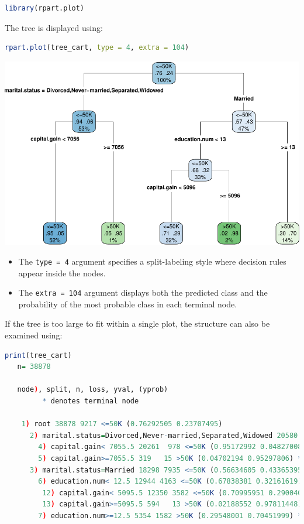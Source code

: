 \documentclass[
]{book}
\newcommand{\passthrough}[1]{#1}
\providecommand{\tightlist}{%
  \setlength{\itemsep}{0pt}\setlength{\parskip}{0pt}}
\theoremstyle{definition}
\theoremstyle{definition}
\theoremstyle{definition}
\theoremstyle{definition}
\theoremstyle{remark}
\begin{document}
\begin{lstlisting}[language=R]
library(rpart.plot)
\end{lstlisting}

The tree is displayed using:

\begin{lstlisting}[language=R]
rpart.plot(tree_cart, type = 4, extra = 104)
\end{lstlisting}

\begin{center}\includegraphics[width=1\linewidth]{tree_files/figure-latex/unnamed-chunk-12-1} \end{center}

\begin{itemize}
\tightlist
\item
  The \passthrough{\lstinline!type = 4!} argument specifies a split-labeling style where decision rules appear inside the nodes.
\item
  The \passthrough{\lstinline!extra = 104!} argument displays both the predicted class and the probability of the most probable class in each terminal node.
\end{itemize}

If the tree is too large to fit within a single plot, the structure can also be examined using:

\begin{lstlisting}[language=R]
print(tree_cart)
   n= 38878 
   
   node), split, n, loss, yval, (yprob)
         * denotes terminal node
   
    1) root 38878 9217 <=50K (0.76292505 0.23707495)  
      2) marital.status=Divorced,Never-married,Separated,Widowed 20580 1282 <=50K (0.93770651 0.06229349)  
        4) capital.gain< 7055.5 20261  978 <=50K (0.95172992 0.04827008) *
        5) capital.gain>=7055.5 319   15 >50K (0.04702194 0.95297806) *
      3) marital.status=Married 18298 7935 <=50K (0.56634605 0.43365395)  
        6) education.num< 12.5 12944 4163 <=50K (0.67838381 0.32161619)  
         12) capital.gain< 5095.5 12350 3582 <=50K (0.70995951 0.29004049) *
         13) capital.gain>=5095.5 594   13 >50K (0.02188552 0.97811448) *
        7) education.num>=12.5 5354 1582 >50K (0.29548001 0.70451999) *
\end{lstlisting}
\end{document}
